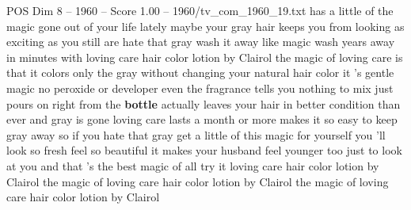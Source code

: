\begin{textsample}{POS Dim 8 – 1960 – Score 1.00 – 1960/tv\_com\_1960\_19.txt}  \label{ex:f8_pos_069}
has a little of the magic gone out of your life lately maybe your gray hair keeps you from looking as exciting as you still are hate that gray wash it away like magic wash years away in minutes with loving care hair color lotion by Clairol the magic of loving care is that it colors only the gray without changing your natural hair color it 's gentle magic no peroxide or developer even the fragrance tells you nothing to mix just pours on right from the \textbf{bottle} actually leaves your hair in better condition than ever and gray is gone loving care lasts a month or more makes it so easy to keep gray away so if you hate that gray get a little of this magic for yourself you 'll look so fresh feel so beautiful it makes your husband feel younger too just to look at you and that 's the best magic of all try it loving care hair color lotion by Clairol the magic of loving care hair color lotion by Clairol the magic of loving care hair color lotion by Clairol

\end{textsample}

